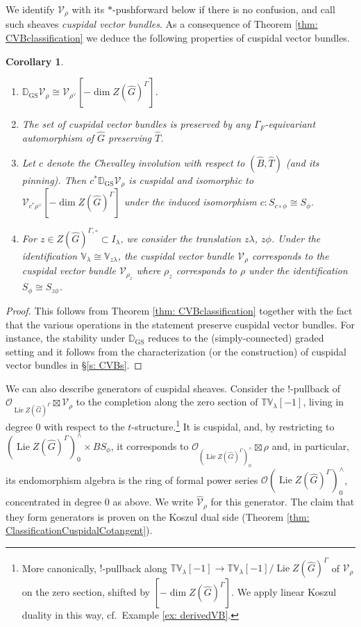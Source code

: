 \documentclass{amsart}
\newtheorem{corollary}[theorem]{Corollary}
\theoremstyle{definition}
\theoremstyle{remark}
\numberwithin{equation}{section}
\DeclareMathOperator{\Lie}{Lie}
\newcommand{\mc}{\mathcal}
\newcommand{\bb}{\mathbb}
\newcommand{\wh}{\widehat}
\newcommand{\D}{\mathbb{D}}
\newcommand{\GS}{\mathrm{GS}}
\newcommand{\V}{\mathbb{V}}
\newcommand{\T}{\mathbb{T}}
\begin{document}
We identify $\mc V_\rho$ with its $*$-pushforward below if there is no confusion, and call such sheaves \emph{cuspidal vector bundles}. As a consequence of Theorem \ref{thm: CVBclassification} we deduce the following properties of cuspidal vector bundles.

\begin{corollary}\label{cor: CVBproperty}
\begin{enumerate}
    \item $\bb D_\GS \mc V_{\rho}\cong \mc V_{\rho^{\vee}}[-\dim Z(\wh G)^{\Gamma}]$. 
    \item The set of cuspidal vector bundles is preserved by any $\Gamma_F$-equivariant automorphism of $\wh G$ preserving $\wh T$.     
    \item Let $c$ denote the Chevalley involution with respect to $(\wh B, \wh T)$ (and its pinning). Then $c^* \D_\GS \mc V_{\rho}$ is cuspidal and isomorphic to $\mc V_{c^* \rho^{\vee}}[-\dim Z(\wh G)^{\Gamma}]$ under the induced isomorphism $c\colon S_{c\circ\phi}\cong S_{\phi}$. 
    \item For $z\in Z(\wh G)^{\Gamma,\circ}\subset I_\lambda$, we consider the translation $z\lambda$, $z\phi$. Under the identification $\V_\lambda\cong \V_{z\lambda}$, the cuspidal vector bundle $\mc V_{\rho}$ corresponds to the cuspidal vector bundle $\mc V_{\rho_z}$ where $\rho_z$ corresponds to $\rho$ under the identification $S_\phi\cong S_{z\phi}$.   
\end{enumerate}
\end{corollary}

\begin{proof}
This follows from Theorem \ref{thm: CVBclassification} together with the fact that the various operations in the statement preserve cuspidal vector bundles. For instance, the stability under $\D_\GS$ reduces to the (simply-connected) graded setting and it follows from the characterization (or the construction) of cuspidal vector bundles in \S \ref{s: CVBs}.  
\end{proof}

We can also describe generators of cuspidal sheaves. Consider the $!$-pullback of $\mc O_{\Lie Z(\wh G)^\Gamma}\boxtimes \mc V_\rho$ to the completion along the zero section of $\T\V_\lambda[-1]$, living in degree 0 with respect to the $t$-structure.\footnote{More canonically, $!$-pullback along $\T\V_\lambda[-1]\to \T\V_\lambda[-1] / \Lie Z(\wh G)^{\Gamma}$ of $\mc V_\rho$ on the zero section, shifted by $[-\dim Z(\wh G)^\Gamma]$. We apply linear Koszul duality in this way, cf.~Example \ref{ex: derivedVB}.} It is cuspidal, and, by restricting to $(\Lie Z(\wh G)^\Gamma)^\wedge_0 \times BS_\phi$, it corresponds to $\mathcal{O}_{(\Lie Z(\wh G)^\Gamma)^\wedge_0}\boxtimes \rho$ and, in particular, its endomorphism algebra is the ring of formal power series $\mc O(\Lie Z(\wh G)^\Gamma)^{\wedge}_0$, concentrated in degree 0 as above. We write $\wh{\mc V}_\rho$ for this generator. The claim that they form generators is proven on the Koszul dual side (Theorem \ref{thm: ClassificationCuspidalCotangent}). 
\end{document}
